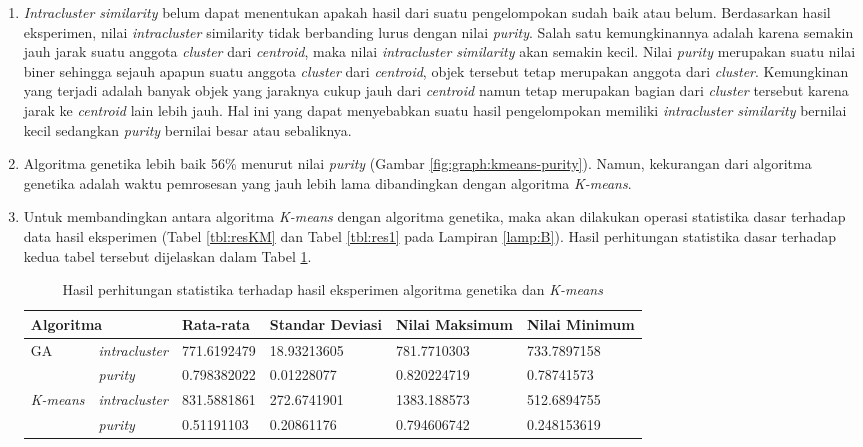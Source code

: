 \begin{enumerate}
	\item \textit{Intracluster similarity} belum dapat menentukan apakah hasil dari suatu pengelompokan sudah baik atau belum. Berdasarkan hasil eksperimen, nilai \textit{intracluster} similarity tidak berbanding lurus dengan nilai \textit{purity}. Salah satu kemungkinannya adalah karena semakin jauh jarak suatu anggota \textit{cluster} dari \textit{centroid}, maka nilai \textit{intracluster similarity} akan semakin kecil. Nilai \textit{purity} merupakan suatu nilai biner sehingga sejauh apapun suatu anggota \textit{cluster} dari \textit{centroid}, objek tersebut tetap merupakan anggota dari \textit{cluster}. Kemungkinan yang terjadi adalah banyak objek yang jaraknya cukup jauh dari \textit{centroid} namun tetap merupakan bagian dari \textit{cluster} tersebut karena jarak ke \textit{centroid} lain lebih jauh. Hal ini yang dapat menyebabkan suatu hasil pengelompokan memiliki \textit{intracluster similarity} bernilai kecil sedangkan \textit{purity} bernilai besar atau sebaliknya.
	\item Algoritma genetika lebih baik 56\% menurut nilai \textit{purity} (Gambar \ref{fig:graph:kmeans-purity}). Namun, kekurangan dari algoritma genetika adalah waktu pemrosesan yang jauh lebih lama dibandingkan dengan algoritma \textit{K-means}. 
	
	\item Untuk membandingkan antara algoritma \textit{K-means} dengan algoritma genetika, maka akan dilakukan operasi statistika dasar terhadap data hasil eksperimen (Tabel \ref{tbl:resKM} dan Tabel \ref{tbl:res1} pada Lampiran \ref{lamp:B}). Hasil perhitungan statistika dasar terhadap kedua tabel tersebut dijelaskan dalam Tabel \ref{tbl:stat-res}.
	
\begin{table}[H]
\begin{tabular}{|l|l|l|l|l|l|}
\hline
\multicolumn{2}{|l|}{Algoritma}         & Rata-rata   & Standar Deviasi & Nilai Maksimum & Nilai Minimum \\ \hline
\multirow{2}{*}{GA}      & \textit{intracluster} & 771.6192479 & 18.93213605     & 781.7710303    & 733.7897158   \\ \cline{2-6} 
                         & \textit{purity}       & 0.798382022 & 0.01228077      & 0.820224719    & 0.78741573    \\ \hline
\multirow{2}{*}{\textit{K-means}} & \textit{intracluster} & 831.5881861 & 272.6741901     & 1383.188573    & 512.6894755   \\ \cline{2-6} 
                         & \textit{purity}       & 0.51191103  & 0.20861176      & 0.794606742    & 0.248153619   \\ \hline
\end{tabular}
\caption{Hasil perhitungan statistika terhadap hasil eksperimen algoritma genetika dan \textit{K-means}}
\label{tbl:stat-res}
\end{table}
	

\end{enumerate}
